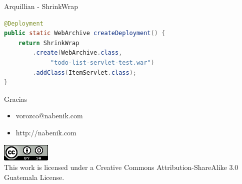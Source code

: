 \documentclass{beamer}
\begin{document}
\begin{frame}[containsverbatim]{Arquillian - ShrinkWrap}

\begin{lstlisting}[language=Java]
@Deployment
public static WebArchive createDeployment() {
	return ShrinkWrap
		.create(WebArchive.class,
			 "todo-list-servlet-test.war")
		.addClass(ItemServlet.class);
}
\end{lstlisting}
\end{frame}


\begin{frame}{Gracias}
\begin{itemize}
\item vorozco@nabenik.com
\item http://nabenik.com
\end{itemize}
\begin{center}
\includegraphics[width=0.1\linewidth]{Images/cclogo}
\\
This work is licensed under a Creative Commons Attribution-ShareAlike 3.0 Guatemala License.
\end{center}
\end{frame}
\end{document}
